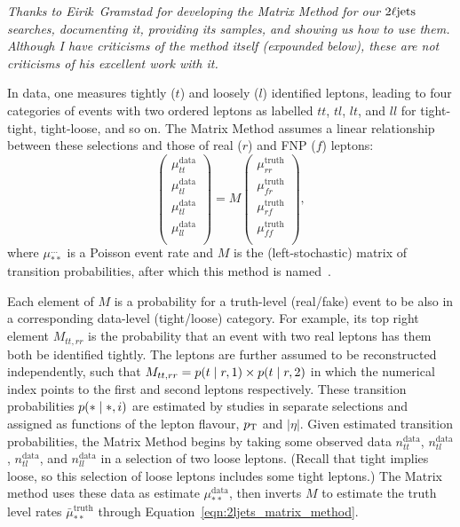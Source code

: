 \emph{
Thanks to Eirik~Gramstad for developing the Matrix Method for our
$2\ell\mathrm{jets}$ searches, documenting it, providing its samples, and showing us how
to use them.
Although I have criticisms of the method itself (expounded below), these
are not criticisms of his excellent work with it.
}

In data, one measures tightly ($t$) and loosely ($l$) identified leptons, leading
to four categories of events with two ordered leptons as labelled $tt$, $tl$,
$lt$, and $ll$ for tight-tight, tight-loose, and so on.
The Matrix Method assumes a linear relationship between these selections
and those of real ($r$) and FNP ($f$) leptons:
\begin{equation}
\label{eqn:2ljets_matrix_method}
\begin{pmatrix}
\mu^\textrm{data}_{tt} \\
\mu^\textrm{data}_{tl} \\
\mu^\textrm{data}_{tl} \\
\mu^\textrm{data}_{ll} \\
\end{pmatrix}
=
M
\begin{pmatrix}
\mu^\textrm{truth}_{rr} \\
\mu^\textrm{truth}_{fr} \\
\mu^\textrm{truth}_{rf} \\
\mu^\textrm{truth}_{ff} \\
\end{pmatrix}
,
\end{equation}
where $\mu^{\ldots}_{**}$ is a Poisson event rate and $M$ is the
(left-stochastic) matrix of transition probabilities, after which this method
is named~\cite{ATLAS-CONF-2014-058}.

Each element of $M$ is a probability for a truth-level (real/fake) event to be
also in a corresponding data-level (tight/loose) category.
For example, its top right element $M_{{tt}, {rr}}$ is the
probability that an event with two real leptons has them both be identified
tightly.
The leptons are further assumed to be reconstructed independently, such that
$M_{{tt}, {rr}} =
p(t \mid r,1)
\times p(t \mid r,2)$
in which the numerical index points to the first and second leptons
respectively.
These transition probabilities $p(* \mid *,i)$ are estimated by studies in
separate selections and assigned as functions of the lepton
flavour, $p_\mathrm{T}$ and $|\eta|$.
Given estimated transition probabilities, the Matrix Method begins by
taking some observed data
$n^\textrm{data}_{tt}$,
$n^\textrm{data}_{tl}$,
$n^\textrm{data}_{tl}$,
and $n^\textrm{data}_{ll}$
in a selection of two loose leptons.
(Recall that tight implies loose, so this selection of loose leptons includes
some tight leptons.)
The Matrix method uses these data as estimate $\mu^\textrm{data}_{**}$,
then inverts $M$ to estimate the truth level rates
$\bar \mu^\textrm{truth}_{**}$ through Equation~\ref{eqn:2ljets_matrix_method}.

